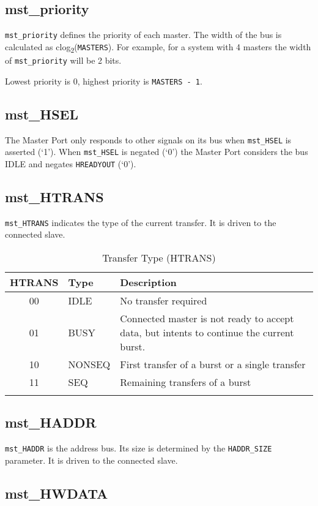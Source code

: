 \subsection{mst\_priority}\label{mst_priority}

\texttt{mst\_priority} defines the priority of each master. The width of the bus is calculated as clog\textsubscript{2}(\texttt{MASTERS}). For example, for a system with 4 masters the width of \texttt{mst\_priority} will be 2 bits.

Lowest priority is 0, highest priority is \texttt{MASTERS - 1}.

\subsection{mst\_HSEL}\label{mst_hsel}

The Master Port only responds to other signals on its bus when \texttt{mst\_HSEL} is
asserted (`1'). When \texttt{mst\_HSEL} is negated (`0') the Master Port
considers the bus IDLE and negates \texttt{HREADYOUT} (`0').

\subsection{mst\_HTRANS}\label{mst_htrans}

\texttt{mst\_HTRANS} indicates the type of the current transfer. It is driven to
the connected slave.

\begin{longtable}[]{@{}clp{9cm}@{}}
\toprule
HTRANS & Type & Description\tabularnewline
\midrule
\endhead
00 & IDLE & No transfer required\tabularnewline
01 & BUSY & Connected master is not ready to accept data, but intents to
continue the current burst.\tabularnewline
10 & NONSEQ & First transfer of a burst or a single
transfer\tabularnewline
11 & SEQ & Remaining transfers of a burst\tabularnewline
\bottomrule
\caption{Transfer Type (HTRANS)}
\end{longtable}


\subsection{mst\_HADDR}\label{mst_haddr}

\texttt{mst\_HADDR} is the address bus. Its size is determined by the \texttt{HADDR\_SIZE}
parameter. It is driven to the connected slave.

\subsection{mst\_HWDATA}\label{mst_hwdata}

